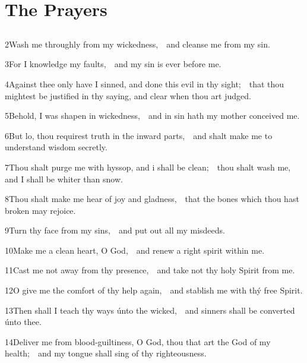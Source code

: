 \medskip

\section{The Prayers}

\subsection{}

2\enspace Wash me throughly from my wickedness,\ \star\ and cleanse me from my sin.

3\enspace For I knowledge my faults,\ \star\ and my sin is ever before me.

4\enspace Against thee only have I sinned, and done this evil in thy sight;\ \star\ that thou mightest be justified in thy saying, and clear when thou art judged.

5\enspace Behold, I was shapen in wickedness,\ \star\ and in sin hath my mother conceived me.

6\enspace But lo, thou requirest truth in the inward parts,\ \star\ and shalt make me to understand wisdom secretly.

7\enspace Thou shalt purge me with hyssop, and i shall be clean;\ \star\ thou shalt wash me, and I shall be whiter than snow.

8\enspace Thou shalt make me hear of joy and gladness,\ \star\ that the bones which thou hast broken may rejoice.

9\enspace Turn thy face from my sins,\ \star\ and put out all my misdeeds.

10\enspace Make me a clean heart, O God,\ \star\ and renew a right spirit within me.

11\enspace Cast me not away from thy presence,\ \star\ and take not thy holy Spirit from me.

12\enspace O give me the comfort of thy help again,\ \star\ and stablish me with thý free Spirit.

13\enspace Then shall I teach thy ways únto the wicked,\ \star\ and sinners shall be converted únto thee.

14\enspace Deliver me from blood-guiltiness, O God, thou that art the God of my health;\ \star\ and my tongue shall sing of thy righteousness.


